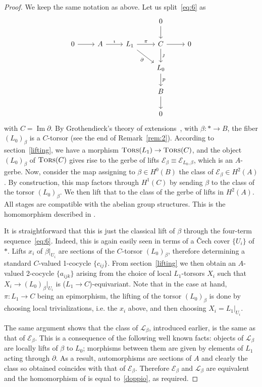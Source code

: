\documentclass{amsart}
\numberwithin{equation}{subsection}
\theoremstyle{remark}
\theoremstyle{remark}
\newcommand{\ie}{i.e.\xspace}
\newcommand{\cE}{\mathcal{E}}
\newcommand{\cL}{\mathcal{L}}
\renewcommand{\Im}{\operatorname{Im}}
\DeclareMathOperator{\tors}{\textsc{Tors}} %
\begin{document}
\begin{proof}
  We keep the same notation as above. Let us split~\eqref{eq:6} as
  \begin{equation*}
    \begin{tikzcd}
      &&& 0 \arrow[d] & \\
      0 \arrow[r] & A \arrow[r, "\imath"] & L_1 \arrow[r, "\pi"] \arrow[dr, "\partial"'] & C \arrow[r] \arrow[d, "\jmath"] & 0 \\
      &          &            & L_0 \arrow[d, "p"] &  \\
      &          &            & B \arrow[d] & \\
      &          &            & 0 &
    \end{tikzcd}
  \end{equation*}
  with $C= \Im \partial$. By Grothendieck's theory of extensions~\cite{GrothendieckSGA7}, with $\beta \colon *\to B$, the fiber $(L_0)_\beta$ is a $C$-torsor (see the end of Remark~\ref{rem:2}). According to section~\ref{lifting}, we have a morphism $\tors (L_1)\to \tors (C)$, and the object $(L_0)_\beta$ of $\tors(C)$ gives rise to the gerbe of lifts  $\cE_\beta\equiv \cE_{L_0,\beta}$, which is an $A$-gerbe. Now, consider the map assigning to $\beta\in H^0(B)$ the class of $\cE_\beta\in H^2(A)$. By construction, this map factors through $H^1(C)$ by sending $\beta$ to the class of the torsor $(L_0)_\beta$. We then lift that to the class of the gerbe of lifts in $H^2(A)$. All stages are compatible with the abelian group structures. This is the homomorphism described in \cite[Théorème 3.4.2]{Giraud}.  

  It is straightforward that this is just the classical lift of $\beta$ through the four-term sequence~\eqref{eq:6}. Indeed, this is again easily seen in terms of a \v Cech cover $\{U_i\}$ of $*$. Lifts $x_i$ of $\beta\rvert_{U_i}$ are sections of the $C$-torsor $(L_0)_\beta$, therefore determining a standard $C$-valued 1-cocycle $\{c_{ij}\}$. From section~\ref{lifting} we then obtain an $A$-valued 2-cocycle $\{a_{ijk}\}$ arising from the choice of local $L_1$-torsors $X_i$ such that $X_i\to (L_0)_\beta \rvert_{U_i}$ is ($L_1\to C$)-equivariant. Note that in the case at hand, $\pi\colon L_1\to C$ being an epimorphism, the lifting of the torsor $(L_0)_\beta$ is done by choosing local trivializations, \ie the $x_i$ above, and then choosing $X_i=L_1\rvert_{U_i}$.

  The same argument shows that the class of $\cL_\beta$, introduced earlier, is the same as that of $\cE_\beta$. This is a consequence of the following well known facts: objects of $\cL_\beta$ are locally lifts of $\beta$ to $L_0$; morphisms between them are given by elements of $L_1$ acting through $\partial$. As a result, automorphisms are sections of $A$ and clearly the class so obtained coincides with that of $\cE_\beta$.  Therefore $\cE_\beta$ and $\cL_\beta$ are equivalent and the homomorphism of \cite[Théorème 3.4.2]{Giraud} is equal to~\eqref{doppio}, as required.
\end{proof}
\end{document}
